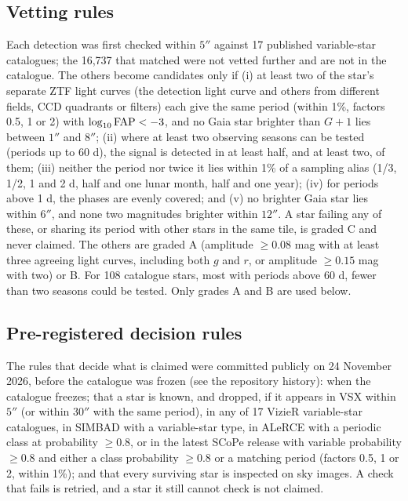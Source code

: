 \documentclass[twocolumn]{searchchev_preprint}
\begin{document}
\subsection{Vetting rules}
Each detection was first checked within $5''$ against 17 published variable-star catalogues; the 16,737 that
matched were not vetted further and are not in the catalogue. The others become candidates only if (i) at least two
of the star's separate ZTF light curves (the detection light curve and others from different fields, CCD quadrants or
filters) each give the same period (within 1\%, factors 0.5, 1 or 2) with $\log_{10}{\rm FAP}<-3$, and no Gaia star
brighter than $G+1$ lies between $1''$ and $8''$; (ii) where at least two observing seasons can be tested (periods up to
60 d), the signal is detected in at least half, and at least two, of them;
(iii) neither the period nor twice it lies within 1\% of a sampling alias (1/3, 1/2, 1 and 2 d, half and one lunar
month, half and one year); (iv) for periods above 1 d, the phases are evenly covered; and (v) no brighter Gaia star
lies within $6''$, and none two magnitudes brighter within $12''$. A star failing any of these, or sharing its period
with other stars in the same tile, is graded C and never claimed. The others are graded A (amplitude $\ge0.08$ mag
with at least three agreeing light curves, including both $g$ and $r$, or amplitude $\ge0.15$ mag with two) or B. For
108 catalogue stars, most with periods above 60 d, fewer than two seasons could be tested. Only grades A
and B are used below.

\subsection{Pre-registered decision rules}
The rules that decide what is claimed were committed publicly on 24 November 2026, before the catalogue was frozen
(see the repository history): when the catalogue freezes; that a star is known, and dropped, if it appears
in VSX \citep{Watson2006} within $5''$ (or within $30''$ with the same period), in any of 17 VizieR variable-star
catalogues, in SIMBAD with a variable-star type, in ALeRCE \citep{SanchezSaez2021} with a periodic class at probability
$\ge0.8$, or in the latest SCoPe release \citep{Healy2024} with variable probability $\ge0.8$ and either a class
probability $\ge0.8$ or a matching period (factors 0.5, 1 or 2, within 1\%); and that every surviving star is inspected on
sky images. A check that fails is retried, and a star it still cannot check is not claimed.
\end{document}
